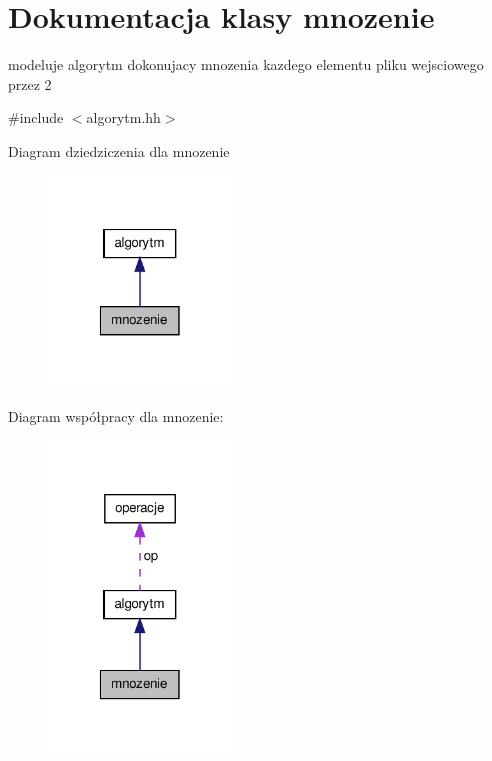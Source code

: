 \hypertarget{classmnozenie}{\section{\-Dokumentacja klasy mnozenie}
\label{classmnozenie}
}


modeluje algorytm dokonujacy mnozenia kazdego elementu pliku wejsciowego przez 2  




{\ttfamily \#include $<$algorytm.\-hh$>$}



\-Diagram dziedziczenia dla mnozenie\nopagebreak
\begin{figure}[H]
\begin{center}
\leavevmode
\includegraphics[width=138pt]{classmnozenie__inherit__graph}
\end{center}
\end{figure}


\-Diagram współpracy dla mnozenie\-:\nopagebreak
\begin{figure}[H]
\begin{center}
\leavevmode
\includegraphics[width=138pt]{classmnozenie__coll__graph}
\end{center}
\end{figure}
